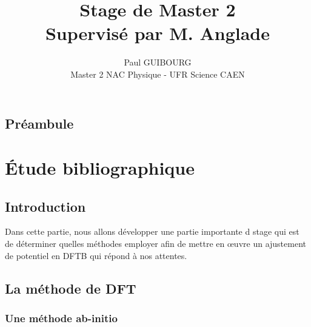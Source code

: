 \documentclass[oneside,finale,10pt]{report}
\title{{\Huge \textbf{Stage de Master 2} }\\ {Supervisé par M. Anglade} \\ \bigskip{\huge {\textbf{Étude de la modélisation DFTB pour l’adapter à des systèmes fortement chargés\\ (Début de rédaction v1.0)}}}}
\author{{\Large Paul GUIBOURG}  \\ {\Large Master 2 NAC Physique - UFR Science CAEN} }
\newenvironment{changemargin}[2]{
\begin{list}{}{%
\setlength{\topsep}{0pt}%
\setlength{\leftmargin}{0pt}%
\setlength{\rightmargin}{0pt}%
\setlength{\listparindent}{\parindent}%
\setlength{\itemindent}{\parindent}%
\setlength{\parsep}{0pt plus 1pt}%
\addtolength{\leftmargin}{#1}%
\addtolength{\rightmargin}{#2}%
}\item }{\end{list}
}
\begin{document}
                  

\maketitle

\tableofcontents{}


\newpage

\begin{changemargin}{2cm}{2cm}

\section*{Préambule}



\end{changemargin}

\newpage


\chapter{Étude bibliographique}

\section{Introduction}

\hspace*{20px}Dans cette partie, nous allons développer une partie importante d stage qui est de déterminer quelles méthodes employer afin de mettre en œuvre un ajustement de potentiel en DFTB qui répond à nos attentes. 

\section{La méthode de DFT}

\subsection{Une méthode ab-initio}
\end{document}
